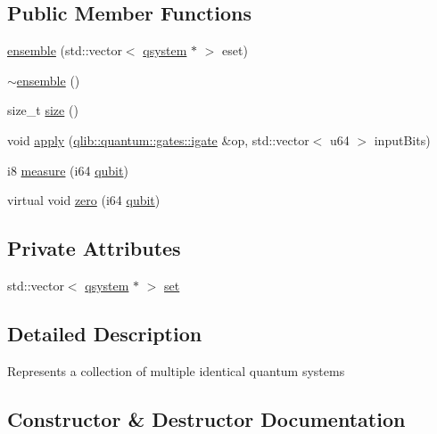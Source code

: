\subsection*{Public Member Functions}
\begin{DoxyCompactItemize}
\item 
\hyperlink{classqlib_1_1quantum_1_1ensemble_a5e088d9ac7394f150f5a2affe0790f2a}{ensemble} (std\+::vector$<$ \hyperlink{classqlib_1_1quantum_1_1qsystem}{qsystem} $\ast$ $>$ eset)
\item 
\hyperlink{classqlib_1_1quantum_1_1ensemble_aae0c56d2d64d4be27b5ab976d60c2747}{$\sim$ensemble} ()
\item 
size\+\_\+t \hyperlink{classqlib_1_1quantum_1_1ensemble_a4b811e4778f5c845504ed8eec058dfe4}{size} ()
\item 
void \hyperlink{classqlib_1_1quantum_1_1ensemble_a9226b1108f8d45d052316f7c366f1d5a}{apply} (\hyperlink{classqlib_1_1quantum_1_1gates_1_1igate}{qlib\+::quantum\+::gates\+::igate} \&op, std\+::vector$<$ u64 $>$ input\+Bits)
\item 
i8 \hyperlink{classqlib_1_1quantum_1_1ensemble_ae5e3ebd119e1df6dbb966b7bb6222e5a}{measure} (i64 \hyperlink{classqlib_1_1quantum_1_1qubit}{qubit})
\item 
virtual void \hyperlink{classqlib_1_1quantum_1_1ensemble_ac170f82a86704e08e8f2bebc721cf03b}{zero} (i64 \hyperlink{classqlib_1_1quantum_1_1qubit}{qubit})
\end{DoxyCompactItemize}
\subsection*{Private Attributes}
\begin{DoxyCompactItemize}
\item 
std\+::vector$<$ \hyperlink{classqlib_1_1quantum_1_1qsystem}{qsystem} $\ast$ $>$ \hyperlink{classqlib_1_1quantum_1_1ensemble_ab77e11f30898f29060ff97236ec26319}{set}
\end{DoxyCompactItemize}


\subsection{Detailed Description}
Represents a collection of multiple identical quantum systems 

\subsection{Constructor \& Destructor Documentation}

